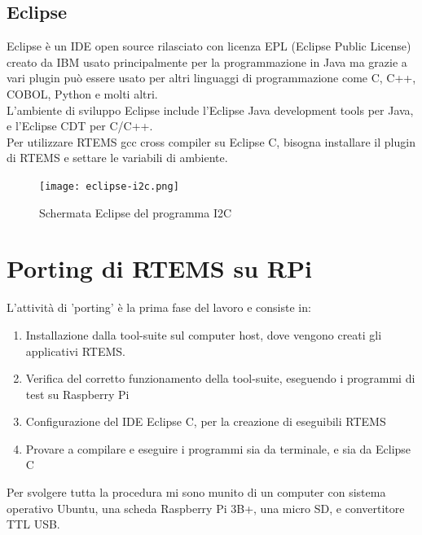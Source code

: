 \documentclass[12pt, a4paper, titlepage, oneside]{book}
\begin{document}
\begin{flushleft}
\section{Eclipse}
Eclipse è un IDE open source rilasciato con licenza EPL (Eclipse Public License) creato da IBM usato principalmente per la programmazione in Java ma grazie a vari plugin può essere usato per altri linguaggi di programmazione come C, C++, COBOL, Python e molti altri. \\
L'ambiente di sviluppo Eclipse include l'Eclipse Java development tools per Java, e l'Eclipse CDT per C/C++. \\
Per utilizzare RTEMS gcc cross compiler su Eclipse C, bisogna installare il plugin di RTEMS e settare le variabili di ambiente.
\begin{figure} [h]
    \centering
    \texttt{[image: eclipse-i2c.png]}
    \caption{Schermata Eclipse del programma I2C }
    \label{fig:eclips-i2c}
\end{figure}
\chapter{Porting di RTEMS su RPi}

L'attività di 'porting' è la prima fase del lavoro e consiste in:
\begin{enumerate}
    \item Installazione dalla tool-suite sul computer host, dove vengono creati gli applicativi RTEMS.
    \item Verifica del corretto funzionamento della tool-suite, eseguendo i programmi di test su Raspberry Pi
    \item Configurazione del IDE Eclipse C, per la creazione di eseguibili RTEMS
    \item Provare a compilare e eseguire i programmi sia da terminale, e sia da Eclipse C
\end{enumerate}
Per svolgere tutta la procedura mi sono munito di un computer con sistema operativo Ubuntu, una scheda Raspberry Pi 3B+, una micro SD, e convertitore TTL USB.\\


\end{flushleft}
\end{document}
